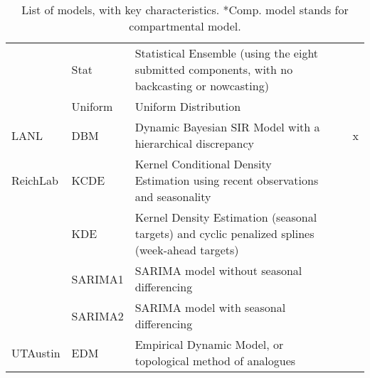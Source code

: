 \begin{table}
\begin{tabular}{p{1.69cm} l p{7.5cm}  p{1.70cm}  p{1.7cm}}
~        & Stat               & Statistical Ensemble (using the eight submitted components, with no backcasting or nowcasting) & ~             & ~                   \\
~        & Uniform            & Uniform Distribution  & ~             & ~                   \\ 
\hline
LANL     & DBM                & Dynamic Bayesian SIR Model with a hierarchical discrepancy & ~             & x                   \\ 
\hline
ReichLab & KCDE               & Kernel Conditional Density Estimation using recent observations and seasonality  & ~             & ~                   \\ 
~        & KDE                & Kernel Density Estimation (seasonal targets) and cyclic penalized splines (week-ahead targets)  & ~             & ~                   \\ 
~        & SARIMA1            & SARIMA model without seasonal differencing & ~             & ~                   \\ 
~        & SARIMA2            & SARIMA model with seasonal differencing & ~             & ~                   \\ 
\hline
UTAustin & EDM                & Empirical Dynamic Model, or topological method of analogues & ~             & ~                   \\ 
\end{tabular}
\caption{List of models, with key characteristics. *Comp. model stands for compartmental model.}
\label{tab:model-list}
\end{table}